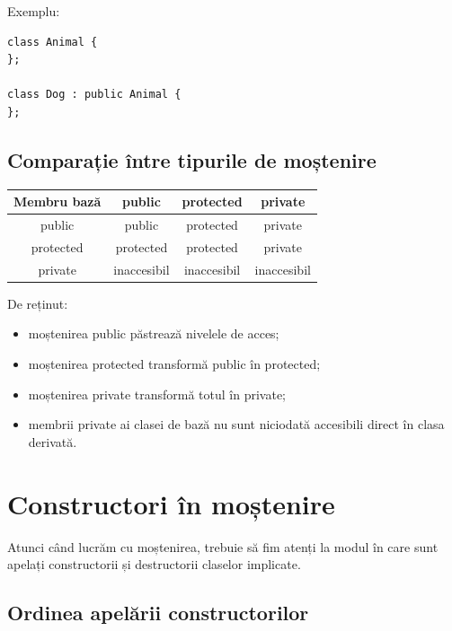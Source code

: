 \documentclass[12pt,a4paper]{article}
\begin{document}
Exemplu:

\begin{verbatim}
class Animal {
};

class Dog : public Animal {
};
\end{verbatim}

\subsection{Comparație între tipurile de moștenire}

\begin{center}
\begin{tabular}{|c|c|c|c|}
\hline
Membru bază & public & protected & private \\
\hline
public & public & protected & private \\
\hline
protected & protected & protected & private \\
\hline
private & inaccesibil & inaccesibil & inaccesibil \\
\hline
\end{tabular}
\end{center}

De reținut:

\begin{itemize}
\item moștenirea public păstrează nivelele de acces;
\item moștenirea protected transformă public în protected;
\item moștenirea private transformă totul în private;
\item membrii private ai clasei de bază nu sunt niciodată accesibili direct în clasa derivată.
\end{itemize}














\section{Constructori în moștenire}

Atunci când lucrăm cu moștenirea, trebuie să fim atenți la modul în care sunt apelați constructorii și destructorii claselor implicate.

\subsection{Ordinea apelării constructorilor}
\end{document}
